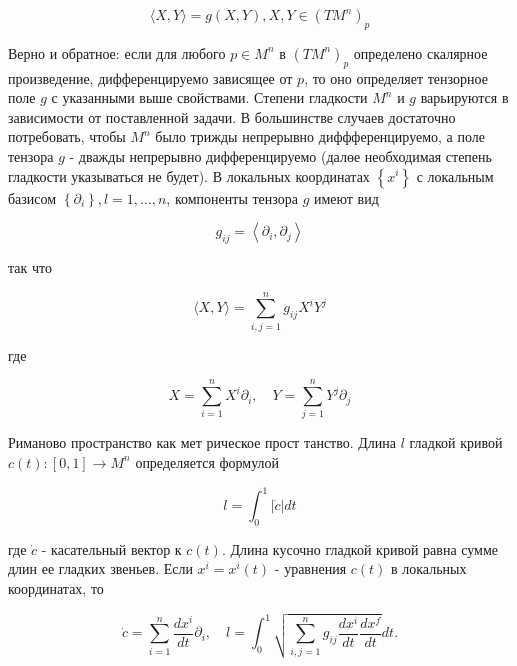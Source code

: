 \documentclass[10pt]{article}
\begin{document}
\[

\langle X, Y\rangle=g(X, Y), X, Y \in\left(T M^{n}\right)_{p}

\]



Верно и обратное: если для любого $p \in M^{n}$ в $\left(T M^{n}\right)_{p}$ определено скалярное произведение, дифференцируемо зависящее от $p$, то оно определяет тензорное поле $g$ с указанными выше свойствами. Степени гладкости $M^{n}$ и $g$ варьируются в зависимости от поставленной задачи. В большинстве случаев достаточно потребовать, чтобы $M^{n}$ было трижды непрерывно диффференцируемо, а поле тензора $g$ - дважды непрерывно дифференцируемо (далөе необходимая степень гладкости указываться не будет). В локальных координатах $\left\{x^{i}\right\}$ с локальным базисом $\left\{\partial_{i}\right\}, l=1, \ldots, n$, компоненты тензора $g$ имеют вид



\[

g_{i j}=\left\langle\partial_{i}, \partial_{j}\right\rangle

\]



так что



\[

\langle X, Y\rangle=\sum_{i, j=1}^{n} g_{i j} X^{i} Y^{j}

\]



где



\[

X=\sum_{i=1}^{n} X^{i} \partial_{i}, \quad Y=\sum_{j=1}^{n} Y^{j} \partial_{j}

\]



Риманово пространство как мет рическое прост танство. Длина $l$ гладкой кривой $c(t):[0,1] \rightarrow M^{n}$ определяется формулой



\[

l=\int_{0}^{1}|\dot{c}| d t

\]



где $\dot{c}$ - касательный вектор к $c(t)$. Длина кусочно гладкой кривой равна сумме длин ее гладких звеньев. Если $x^{i}=x^{i}(t)$ - уравнения $c(t)$ в локальных координатах, то



\[

\dot{c}=\sum_{i=1}^{n} \frac{d x^{i}}{d t} \partial_{i}, \quad l=\int_{0}^{1} \sqrt{\sum_{i, j=1}^{n} g_{i j} \frac{d x^{i}}{d t} \frac{d x^{f}}{d t}} d t .

\]
\end{document}
